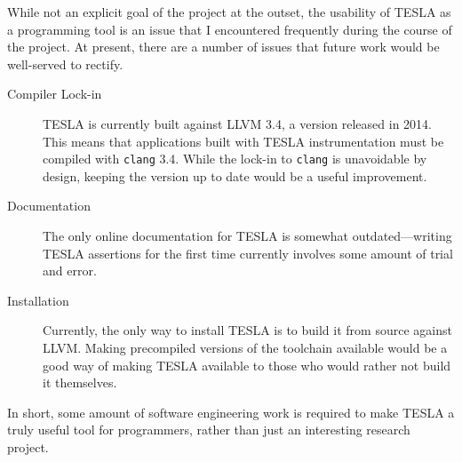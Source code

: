 While not an explicit goal of the project at the outset, the usability of TESLA
as a programming tool is an issue that I encountered frequently during the
course of the project. At present, there are a number of issues that future work
would be well-served to rectify.
\begin{description}
  \item[Compiler Lock-in] TESLA is currently built against LLVM 3.4, a version
  released in 2014. This means that applications built with TESLA
  instrumentation must be compiled with \texttt{clang} 3.4. While the lock-in to
  \texttt{clang} is unavoidable by design, keeping the version up to date would
  be a useful improvement.
  
  \item[Documentation] The only online documentation for TESLA is somewhat
  outdated---writing TESLA assertions for the first time currently involves some
  amount of trial and error.

  \item[Installation] Currently, the only way to install TESLA is to build it
  from source against LLVM. Making precompiled versions of the toolchain
  available would be a good way of making TESLA available to those who would
  rather not build it themselves.
\end{description}

In short, some amount of software engineering work is required to make TESLA a
truly useful tool for programmers, rather than just an interesting research
project.
